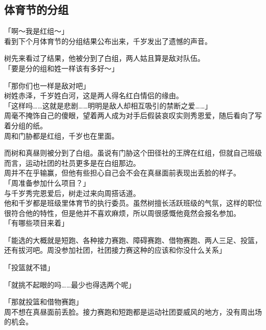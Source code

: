 \subsection{体育节的分组}

「啊～我是红组～」\\

看到下个月体育节的分组结果公布出来，千岁发出了遗憾的声音。

树先来看过了结果，他被分到了白组，两人姑且算是敌对队伍。\\

「要是分的组和姓一样该有多好～」

「那你们也一样是敌对吧」\\

树姓赤泽，千岁姓白河，这是两人得名红白情侣的缘由。\\

「这样吗……这就是悲剧……明明是敌人却相互吸引的禁断之爱……」\\

周毫不掩饰自己的傻眼，望着两人成为对手后假装哀叹实则秀恩爱，随后看向了写着分组的纸。\\

周和门胁都是红组，千岁也在里面。

而树和真昼则被分到了白组。虽说有门胁这个田径社的王牌在红组，但就自己班级而言，运动社团的社员更多是在白组那边。\\

周并不在乎输赢，但他有些担心自己会不会在真昼面前表现出丢脸的样子。\\

「周准备参加什么项目？」\\

与千岁秀完恩爱后，树走过来向周搭话道。\\

他和千岁都是班级里体育节的执行委员。虽然树擅长活跃班级的气氛，这样的职位很符合他的特性，但是他并不喜欢麻烦，所以周很感慨他竟然会报名参加。\\

「有哪些项目来着」

「能选的大概就是短跑、各种接力赛跑、障碍赛跑、借物赛跑、两人三足、投篮，还有拔河吧。周没参加社团，社团接力赛这种的应该和你没什么关系」

「投篮就不错」

「就挑不起眼的吗……最少也得选两个呢」

「那就投篮和借物赛跑」\\

周不想在真昼面前丢脸。接力赛跑和短跑都是运动社团耍威风的地方，没有周出场的机会。

